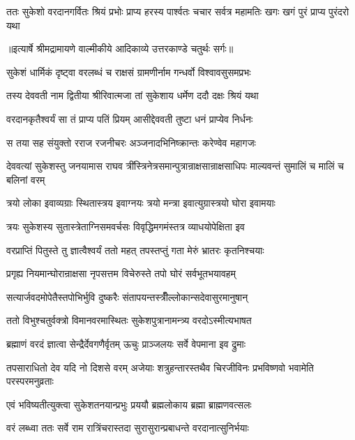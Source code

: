 \fourlineindentedshloka
{ततः सुकेशो वरदानगर्वितः}
{ श्रियं प्रभोः प्राप्य हरस्य पार्श्वतः}
{चचार सर्वत्र महामतिः खगः}
{ खगं पुरं प्राप्य पुरंदरो यथा} %


{॥इत्यार्षे श्रीमद्रामायणे वाल्मीकीये आदिकाव्ये उत्तरकाण्डे चतुर्थः सर्गः॥}


\twolineshloka
{सुकेशं धार्मिकं दृष्ट्वा वरलब्धं च राक्षसं}
{ग्रामणीर्नाम गन्धर्वो विश्वावसुसमप्रभः} %

\twolineshloka
{तस्य देववती नाम द्वितीया श्रीरिवात्मजा}
{तां सुकेशाय धर्मेण ददौ दक्षः श्रियं यथा} %

\twolineshloka
{वरदानकृतैश्वर्यं सा तं प्राप्य पतिं प्रियम्}
{आसीद्देववती तुष्टा धनं प्राप्येव निर्धनः} %

\twolineshloka
{स तया सह संयुक्तो रराज रजनीचरः}
{अञ्जनादभिनिष्क्रान्तः करेण्वेव महागजः} %

\threelineshloka
{देववत्यां सुकेशस्तु जनयामास राघव}
{त्रींस्त्रिनेत्रसमान्पुत्रान्राक्षसान्राक्षसाधिपः}
{माल्यवन्तं सुमालिं च मालिं च बलिनां वरम्} %

\twolineshloka
{त्रयो लोका इवाव्यग्राः स्थितास्त्रय इवाग्नयः}
{त्रयो मन्त्रा इवात्युग्रास्त्रयो घोरा इवामयाः} %

\twolineshloka
{त्रयः सुकेशस्य सुतास्त्रेताग्निसमवर्चसः}
{विवृद्धिमगमंस्तत्र व्याधयोपेक्षिता इव} %

\twolineshloka
{वरप्राप्तिं पितुस्ते तु ज्ञात्वैश्वर्यं ततो महत्}
{तपस्तप्तुं गता मेरुं भ्रातरः कृतनिश्चयाः} %

\twolineshloka
{प्रगृह्य नियमान्घोरान्राक्षसा नृपसत्तम}
{विचेरुस्ते तपो घोरं सर्वभूतभयावहम्} %

\twolineshloka
{सत्यार्जवदमोपेतैस्तपोभिर्भुवि दुष्करैः}
{संतापयन्तस्त्रीँल्लोकान्सदेवासुरमानुषान्} %

\twolineshloka
{ततो विभुश्चतुर्वक्त्रो विमानवरमास्थितः}
{सुकेशपुत्रानामन्त्र्य वरदोऽस्मीत्यभाषत} %

\twolineshloka
{ब्रह्माणं वरदं ज्ञात्वा सेन्द्रैर्देवगणैर्वृतम्}
{ऊचुः प्राञ्जलयः सर्वे वेपमाना इव द्रुमाः} %

\threelineshloka
{तपसाराधितो देव यदि नो दिशसे वरम्}
{अजेयाः शत्रुहन्तारस्तथैव चिरजीविनः}
{प्रभविष्णवो भवामेति परस्परमनुव्रताः} %

\twolineshloka
{एवं भविष्यतीत्युक्त्वा सुकेशतनयान्प्रभुः}
{प्रययौ ब्रह्मलोकाय ब्रह्मा ब्राह्मणवत्सलः} %

\twolineshloka
{वरं लब्ध्वा ततः सर्वे राम रात्रिंचरास्तदा}
{सुरासुरान्प्रबाधन्ते वरदानात्सुनिर्भयाः} %

